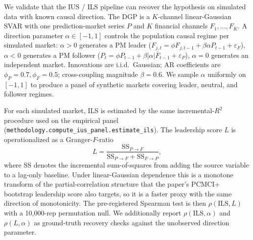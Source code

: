 \documentclass{article}
\begin{document}
We validate that the IUS / ILS pipeline can recover the hypothesis on simulated data with known causal direction. The DGP is a $K$-channel linear-Gaussian SVAR with one prediction-market series $P$ and $K$ financial channels $F_1, \ldots, F_K$. A direction parameter $\alpha \in [-1, 1]$ controls the population causal regime per simulated market: $\alpha > 0$ generates a PM leader ($F_{j,t} = \phi F_{j,t-1} + \beta \alpha P_{t-1} + \varepsilon_F$), $\alpha < 0$ generates a PM follower ($P_t = \phi P_{t-1} + \beta |\alpha| \overline{F}_{t-1} + \varepsilon_P$), $\alpha = 0$ generates an independent market. Innovations are i.i.d.\ Gaussian; AR coefficients are $\phi_P = 0.7, \phi_F = 0.5$; cross-coupling magnitude $\beta = 0.6$. We sample $\alpha$ uniformly on $[-1, 1]$ to produce a panel of synthetic markets covering leader, neutral, and follower regimes.

For each simulated market, ILS is estimated by the same incremental-$R^2$ procedure used on the empirical panel (\texttt{methodology.compute\_ius\_panel.estimate\_ils}). The leadership score $L$ is operationalized as a Granger-$F$-ratio
\begin{equation*}
L = \frac{\mathrm{SS}_{P \to F}}{\mathrm{SS}_{P \to F} + \mathrm{SS}_{F \to P}},
\end{equation*}
where $\mathrm{SS}$ denotes the incremental sum-of-squares from adding the source variable to a lag-only baseline. Under linear-Gaussian dependence this is a monotone transform of the partial-correlation structure that the paper's PCMCI+ bootstrap leadership score also targets, so it is a faster proxy with the same direction of monotonicity. The pre-registered Spearman test is then $\rho(\mathrm{ILS}, L)$ with a 10{,}000-rep permutation null. We additionally report $\rho(\mathrm{ILS}, \alpha)$ and $\rho(L, \alpha)$ as ground-truth recovery checks against the unobserved direction parameter.
\end{document}
